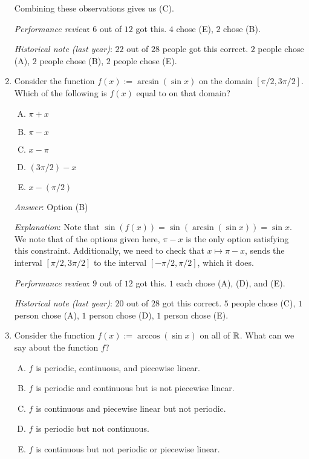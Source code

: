 \documentclass[10pt]{amsart}
\begin{document}
\begin{enumerate}
  Combining these observations gives us (C).

  {\em Performance review}: $6$ out of $12$ got this. $4$ chose (E),
  $2$ chose (B).

  {\em Historical note (last year)}: $22$ out of $28$ people got this
  correct. $2$ people chose (A), $2$ people chose (B), $2$ people
  chose (E).

\item Consider the function $f(x) := \arcsin(\sin x)$ on the domain
  $[\pi/2,3\pi/2]$. Which of the following is $f(x)$ equal to on that
  domain?

  \begin{enumerate}[(A)]
  \item $\pi + x$
  \item $\pi - x$
  \item $x - \pi$
  \item $(3\pi/2) - x$
  \item $x - (\pi/2)$
  \end{enumerate}

  {\em Answer}: Option (B)

  {\em Explanation}: Note that $\sin(f(x)) = \sin(\arcsin(\sin x)) =
  \sin x$. We note that of the options given here, $\pi - x$ is the
  only option satisfying this constraint. Additionally, we need to
  check that $x \mapsto \pi - x$, sends the interval $[\pi/2,3\pi/2]$
  to the interval $[-\pi/2,\pi/2]$, which it does.

  {\em Performance review}: $9$ out of $12$ got this. $1$ each chose
  (A), (D), and (E).

  {\em Historical note (last year)}: $20$ out of $28$  got this correct. $5$
  people chose (C), $1$ person chose (A), $1$ person chose (D), $1$
  person chose (E).
\item Consider the function $f(x) := \arccos(\sin x)$ on all of
  $\mathbb{R}$. What can we say about the function $f$?

  \begin{enumerate}[(A)]
  \item $f$ is periodic, continuous, and piecewise linear.
  \item $f$ is periodic and continuous but is not piecewise linear.
  \item $f$ is continuous and piecewise linear but not periodic.
  \item $f$ is periodic but not continuous.
  \item $f$ is continuous but not periodic or piecewise linear.
  \end{enumerate}


\end{enumerate}
\end{document}
